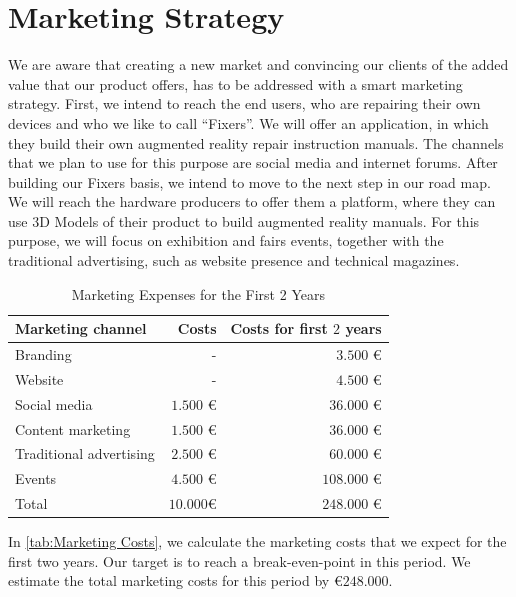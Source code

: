 \section{Marketing Strategy}
We are aware that creating a new market and convincing our clients of the added value that our product offers, has to be addressed with a smart marketing strategy. 
	First, we intend to reach the end users, who are repairing their own devices and who we like to call “Fixers”. We will offer an application, in which they build their own augmented reality repair instruction manuals. The channels that we plan to use for this purpose are social media and internet forums. After building our Fixers basis, we intend to move to the next step in our road map. 
	We will reach the hardware producers to offer them a platform, where they can use $3$D Models of their product to build augmented reality manuals. For this purpose, we will focus on exhibition and fairs events, together with the traditional advertising, such as website presence and technical magazines.
	\begin{table}[H]
\caption[Marketing Expenses for the First 2 Years]{Marketing Expenses for the First 2 Years}
\label{tab:Marketing Costs}
\begin{center}
\begin{tabular}{|l|r|r|}
\hline 
Marketing channel & Costs & Costs for first $2$ years \\ 
\hline 
Branding & - & $3.500$ \euro \\ 
\hline 
Website & - & $4.500$ \euro \\ 
\hline 
Social media & $1.500$ \euro & $36.000$ \euro \\ 
\hline 
Content marketing & $1.500$ \euro & $36.000$ \euro \\ 
\hline 
Traditional advertising & $2.500$ \euro & $60.000$ \euro \\ 
\hline 
Events & $4.500$ \euro & $108.000$ \euro \\ 
\hline 
Total & $10.000$\euro & $248.000$ \euro \\ 
\hline 
\end{tabular} 
\end{center}
\end{table}
In \autoref{tab:Marketing Costs}, we calculate the marketing costs that we expect for the first two years. Our target is to reach a break-even-point in this period. We estimate the total marketing costs for this period by \euro $248.000$.
